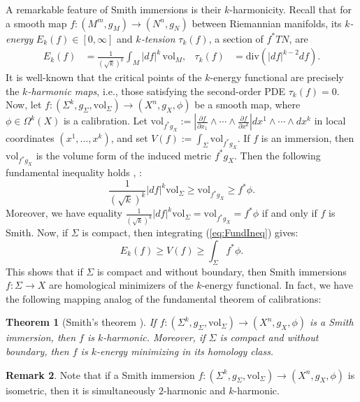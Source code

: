 \documentclass[11pt]{article}
\newcommand{\vol}{\mathrm{vol}}
\newtheorem{thm}{Theorem}[section]
\theoremstyle{definition}
\newtheorem{rmk}[thm]{Remark}
\numberwithin{equation}{section}
\begin{document}
\indent A remarkable feature of Smith immersions is their $k$-harmonicity.  Recall that for a smooth map $f \colon (M^m, g_M) \to (N^n, g_N)$ between Riemannian manifolds, its \emph{$k$-energy} $E_k(f) \in [0,\infty]$ and \emph{$k$-tension} $\tau_k(f)$, a section of $f^*TN$, are
\begin{align*}
E_k(f) & = \frac{1}{(\sqrt{k})^k} \int_M |df|^k\,\vol_M, & \tau_k(f) & = \mathrm{div}(|df|^{k-2} df).
\end{align*}
It is well-known that the critical points of the $k$-energy functional are precisely the \emph{$k$-harmonic maps}, i.e., those satisfying the second-order PDE $\tau_k(f) = 0$.  \\
\indent Now, let $f \colon (\Sigma^k, g_\Sigma, \vol_\Sigma) \to (X^n, g_X, \phi)$ be a smooth map, where $\phi \in \Omega^k(X)$ is a calibration.  Let $\vol_{f^*g_X} := \left| \frac{\partial f}{\partial x_1} \wedge \cdots \wedge \frac{\partial f}{\partial x^k}  \right| dx^1 \wedge \cdots \wedge dx^k$ in local coordinates $(x^1, \ldots, x^k)$, and set $V(f) := \int_\Sigma \vol_{f^*g_X}$.  If $f$ is an immersion, then $\vol_{f^*g_X}$ is the volume form of the induced metric $f^*g_X$.  Then the following fundamental inequality holds \cite{cheng2023variational}, \cite{ikonen2024liouville}:
\begin{equation} \label{eq:FundIneq}
\frac{1}{(\sqrt{k})^k}|df|^k \vol_\Sigma \geq \vol_{f^*g_X} \geq f^*\phi.
\end{equation}
Moreover, we have equality $\frac{1}{(\sqrt{k})^k}|df|^k \vol_\Sigma = \vol_{f^*g_X} = f^*\phi$ if and only if $f$ is Smith.  Now, if $\Sigma$ is compact, then integrating (\ref{eq:FundIneq}) gives:
$$E_k(f) \geq V(f) \geq \int_\Sigma f^*\phi.$$
This shows that if $\Sigma$ is compact and without boundary, then Smith immersions $f \colon \Sigma \to X$ are homological minimizers of the $k$-energy functional.  In fact, we have the following mapping analog of the fundamental theorem of calibrations:

\begin{thm}[Smith's theorem \cite{smith2011theory}] If $f \colon (\Sigma^k, g_\Sigma, \vol_\Sigma) \to (X^n, g_X, \phi)$ is a Smith immersion, then $f$ is $k$-harmonic.  Moreover, if $\Sigma$ is compact and without boundary, then $f$ is $k$-energy minimizing in its homology class.
\end{thm}

\begin{rmk} Note that if a Smith immersion $f \colon (\Sigma^k, g_\Sigma, \vol_\Sigma) \to (X^n, g_X, \phi)$ is isometric, then it is simultaneously $2$-harmonic and $k$-harmonic.
\end{rmk}
\end{document}
